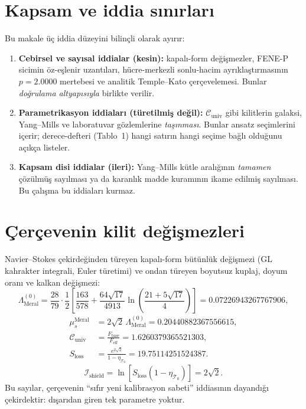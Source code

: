 \documentclass[12pt,a4paper]{article}
\begin{document}
\section{Kapsam ve iddia sınırları}
Bu makale üç iddia düzeyini bilinçli olarak ayırır:
\begin{enumerate}
    \item \textbf{Cebirsel ve sayısal iddialar (kesin):} kapalı-form
    değişmezler, FENE-P sicimin öz-eşlenir uzantıları, hücre-merkezli
    sonlu-hacim ayrıklaştırmasının $p = 2.0000$ mertebesi ve
    analitik Temple--Kato çerçevelemesi. Bunlar \emph{doğrulama
    altyapısıyla} birlikte verilir.
    \item \textbf{Parametrikasyon iddiaları (türetilmiş değil):}
    $\mathcal{C}_{\mathrm{univ}}$ gibi kilitlerin galaksi, Yang--Mills ve
    laboratuvar gözlemlerine \emph{taşınması}. Bunlar ansatz seçimlerini
    içerir; derece-defteri (Tablo~1) hangi satırın hangi seçime bağlı
    olduğunu açıkça listeler.
    \item \textbf{Kapsam disi iddialar (ileri):} Yang--Mills kütle
    aralığının \emph{tamamen} çözülmüş sayılması ya da karanlık madde
    kuramının ikame edilmiş sayılması. Bu çalışma bu iddiaları kurmaz.
\end{enumerate}

\section{Çerçevenin kilit değişmezleri}
Navier--Stokes çekirdeğinden türeyen kapalı-form bütünlük değişmezi
($\mathrm{GL}$ kahrakter integrali, Euler türetimi) ve ondan türeyen
boyutsuz kuplaj, doyum oranı ve kalkan değişmezi:
\begin{equation}
\label{eq:core}
\Lambda_{\mathrm{Meral}}^{(0)} = \frac{28}{79}\cdot\frac{1}{2}
\left[\frac{163}{578} + \frac{64\sqrt{17}}{4913}
\ln\!\left(\frac{21+5\sqrt{17}}{4}\right)\right] = 0.07226943267767906,
\end{equation}
\begin{equation}
\label{eq:core2}
\begin{split}
\mu_s^{\mathrm{Meral}} &= 2\sqrt{2}\,\Lambda_{\mathrm{Meral}}^{(0)}
= 0.20440882367556615, \\
\mathcal{C}_{\mathrm{univ}} &= \frac{F_{\mathrm{base}}}{F_{\mathrm{eff}}}
= 1.6260379365521303, \\
S_{\mathrm{loss}} &= \frac{e^{2\sqrt{2}}}{1-\eta_{\mathcal{T}_0}}
= 19.75114251524387.
\end{split}
\end{equation}
\begin{equation}
\label{eq:core3}
\mathcal{I}_{\mathrm{shield}} = \ln\!\left[S_{\mathrm{loss}}(1-\eta_{\mathcal{T}_0})\right] = 2\sqrt{2}.
\end{equation}
Bu sayılar, çerçevenin ``sıfır yeni kalibrasyon sabeti'' iddiasının
dayandığı çekirdektir: dışarıdan giren tek parametre yoktur.
\end{document}
